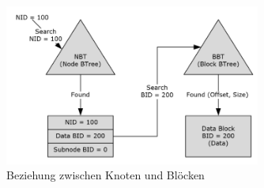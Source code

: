 \begin{figure}
    \centering
    \includegraphics[width=0.75\textwidth]{images/nodes_blocks_pst.PNG}
    \caption{Beziehung zwischen Knoten und Blöcken \cite{.c}} 
    \label{fig:nodesblockspst}
\end{figure}